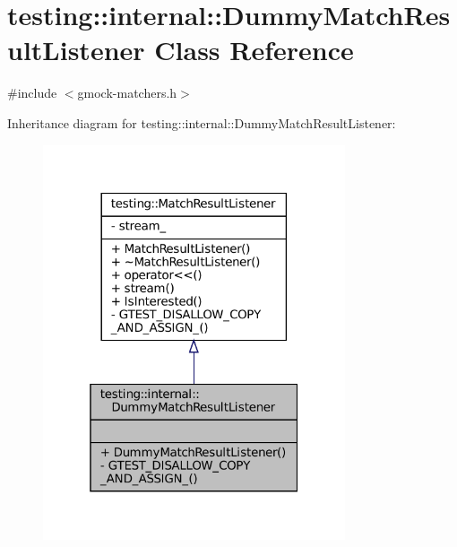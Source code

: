 \hypertarget{classtesting_1_1internal_1_1DummyMatchResultListener}{}\section{testing\+:\+:internal\+:\+:Dummy\+Match\+Result\+Listener Class Reference}
\label{classtesting_1_1internal_1_1DummyMatchResultListener}


{\ttfamily \#include $<$gmock-\/matchers.\+h$>$}



Inheritance diagram for testing\+:\+:internal\+:\+:Dummy\+Match\+Result\+Listener\+:
\nopagebreak
\begin{figure}[H]
\begin{center}
\leavevmode
\includegraphics[width=253pt]{classtesting_1_1internal_1_1DummyMatchResultListener__inherit__graph}
\end{center}
\end{figure}


